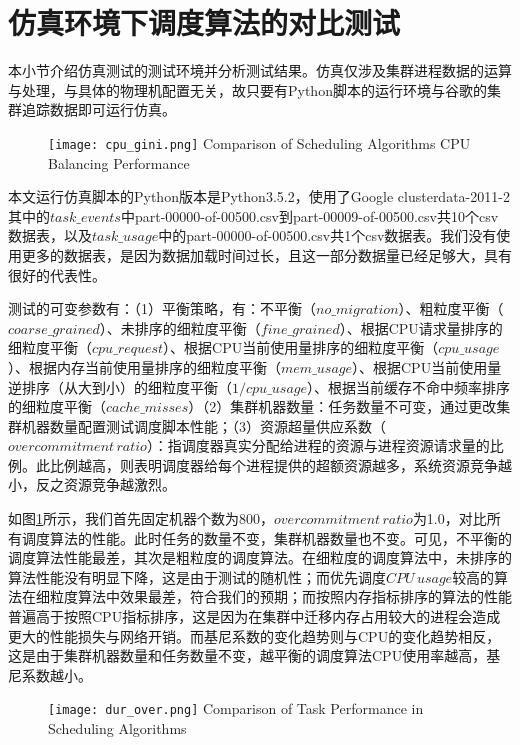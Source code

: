 \section{仿真环境下调度算法的对比测试}

本小节介绍仿真测试的测试环境并分析测试结果。仿真仅涉及集群进程数据的运算与处理，与具体的物理机配置无关，故只要有Python脚本的运行环境与谷歌的集群追踪数据即可运行仿真。

\begin{figure}[!htp]
  \centering
  \texttt{[image: cpu\_gini.png]}
    {Comparison of Scheduling Algorithms CPU Balancing Performance}
  \label{fig:cpu_gini}
\end{figure}
本文运行仿真脚本的Python版本是Python3.5.2，使用了Google clusterdata-2011-2其中的$task\_events$中part-00000-of-00500.csv到part-00009-of-00500.csv共10个csv数据表，以及$task\_usage$中的part-00000-of-00500.csv共1个csv数据表。我们没有使用更多的数据表，是因为数据加载时间过长，且这一部分数据量已经足够大，具有很好的代表性。

测试的可变参数有：（1）平衡策略，有：不平衡（$no\_migration$）、粗粒度平衡（$coarse\_grained$）、未排序的细粒度平衡（$fine\_grained$）、根据CPU请求量排序的细粒度平衡（$cpu\_request$）、根据CPU当前使用量排序的细粒度平衡（$cpu\_usage$）、根据内存当前使用量排序的细粒度平衡（$mem\_usage$）、根据CPU当前使用量逆排序（从大到小）的细粒度平衡（$1/cpu\_usage$）、根据当前缓存不命中频率排序的细粒度平衡（$cache\_misses$）（2）集群机器数量：任务数量不可变，通过更改集群机器数量配置测试调度脚本性能；（3）资源超量供应系数（$overcommitment\,ratio$）：指调度器真实分配给进程的资源与进程资源请求量的比例。此比例越高，则表明调度器给每个进程提供的超额资源越多，系统资源竞争越小，反之资源竞争越激烈。

如图\ref{fig:cpu_gini}所示，我们首先固定机器个数为800，$overcommitment\,ratio$为1.0，对比所有调度算法的性能。此时任务的数量不变，集群机器数量也不变。可见，不平衡的调度算法性能最差，其次是粗粒度的调度算法。在细粒度的调度算法中，未排序的算法性能没有明显下降，这是由于测试的随机性；而优先调度$CPU\,usage$较高的算法在细粒度算法中效果最差，符合我们的预期；而按照内存指标排序的算法的性能普遍高于按照CPU指标排序，这是因为在集群中迁移内存占用较大的进程会造成更大的性能损失与网络开销。而基尼系数的变化趋势则与CPU的变化趋势相反，这是由于集群机器数量和任务数量不变，越平衡的调度算法CPU使用率越高，基尼系数越小。

\begin{figure}[!htp]
  \centering
  \texttt{[image: dur\_over.png]}
    {Comparison of Task Performance in Scheduling Algorithms}
  \label{fig:dur_over}
\end{figure}

